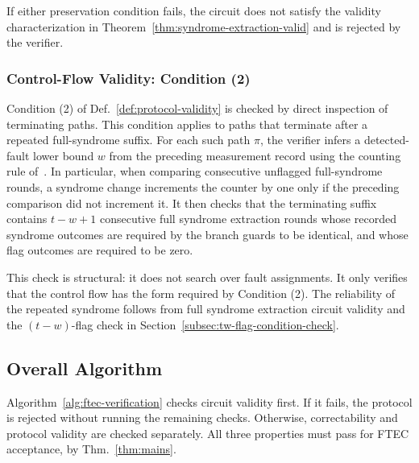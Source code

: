 \documentclass[acmsmall,screen,review,anonymous,nonacm]{acmart}
\begin{document}
If either preservation condition fails,
the circuit does not satisfy the validity
characterization in
Theorem~\ref{thm:syndrome-extraction-valid}
and is rejected by the verifier.
\subsubsection{Control-Flow Validity: Condition (2)}
\label{subsec:cf-validity-condition2}

Condition (2) of Def.~\ref{def:protocol-validity} is checked by direct
inspection of terminating paths. This condition applies to paths that terminate
after a repeated full-syndrome suffix. For each such path $\pi$, the verifier
infers a detected-fault lower bound $w$ from the preceding measurement
record using the counting rule of~\cite[Sections~2.2 and~3.1]{CB18}.
In particular, when comparing consecutive unflagged full-syndrome
rounds, a syndrome change increments the counter by one only if the
preceding comparison did not increment it.
It then checks that the terminating suffix contains $t-w+1$ consecutive full
syndrome extraction rounds whose recorded syndrome outcomes are required by the
branch guards to be identical, and whose flag outcomes are required to be zero.

This check is structural: it does not search over fault assignments. It only
verifies that the control flow has the form required by Condition (2). The
reliability of the repeated syndrome follows from full syndrome extraction
circuit validity and the $(t-w)$-flag check in
Section~\ref{subsec:tw-flag-condition-check}.
\subsection{Overall Algorithm}
\label{subsec:overall-algorithm}

Algorithm~\ref{alg:ftec-verification} checks circuit validity first.
If it fails, the protocol is rejected without running the remaining
checks. Otherwise, correctability and protocol validity are checked
separately. All three properties must pass for FTEC acceptance,
by Thm.~\ref{thm:mains}.
\end{document}
